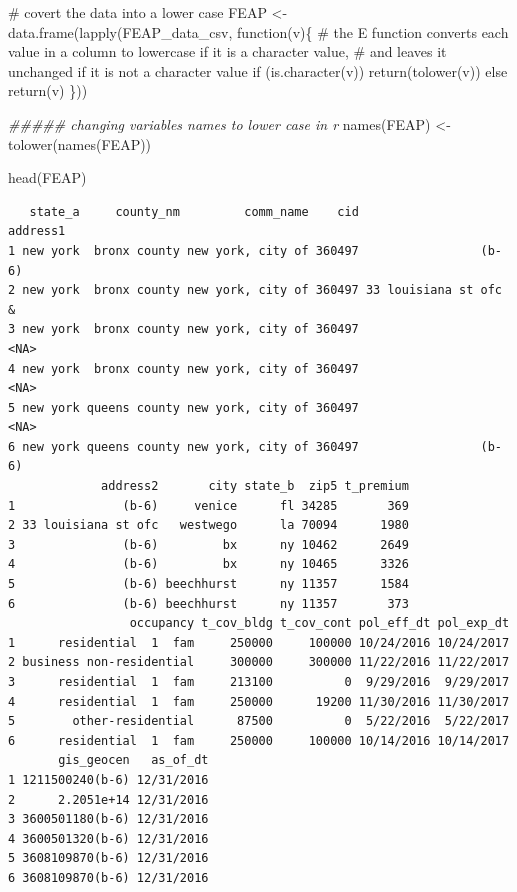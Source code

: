 \documentclass[
  letterpaper,
  DIV=11,
  numbers=noendperiod]{scrartcl}
\newenvironment{Shaded}{\begin{snugshade}}{\end{snugshade}}
\newcommand{\CommentTok}[1]{\textcolor[rgb]{0.37,0.37,0.37}{#1}}
\newcommand{\ControlFlowTok}[1]{\textcolor[rgb]{0.00,0.23,0.31}{#1}}
\newcommand{\DocumentationTok}[1]{\textcolor[rgb]{0.37,0.37,0.37}{\textit{#1}}}
\newcommand{\FunctionTok}[1]{\textcolor[rgb]{0.28,0.35,0.67}{#1}}
\newcommand{\NormalTok}[1]{\textcolor[rgb]{0.00,0.23,0.31}{#1}}
\newcommand{\OtherTok}[1]{\textcolor[rgb]{0.00,0.23,0.31}{#1}}
\begin{document}
\begin{Shaded}
\begin{Highlighting}[]
\CommentTok{\# covert the data into a lower case }
\NormalTok{FEAP }\OtherTok{\textless{}{-}} \FunctionTok{data.frame}\NormalTok{(}\FunctionTok{lapply}\NormalTok{(FEAP\_data\_csv, }\ControlFlowTok{function}\NormalTok{(v)\{}
  \CommentTok{\# the E function converts each value in a column to lowercase if it is a character value,}
  \CommentTok{\# and leaves it unchanged if it is not a character value}
  \ControlFlowTok{if}\NormalTok{ (}\FunctionTok{is.character}\NormalTok{(v)) }
    \FunctionTok{return}\NormalTok{(}\FunctionTok{tolower}\NormalTok{(v))}
  \ControlFlowTok{else} 
    \FunctionTok{return}\NormalTok{(v)}
\NormalTok{\}))}

\DocumentationTok{\#\#\#\#\# changing variables names to lower case in r}
\FunctionTok{names}\NormalTok{(FEAP) }\OtherTok{\textless{}{-}} \FunctionTok{tolower}\NormalTok{(}\FunctionTok{names}\NormalTok{(FEAP))}

\FunctionTok{head}\NormalTok{(FEAP)}
\end{Highlighting}
\end{Shaded}

\begin{verbatim}
   state_a     county_nm         comm_name    cid              address1
1 new york  bronx county new york, city of 360497                 (b-6)
2 new york  bronx county new york, city of 360497 33 louisiana st ofc &
3 new york  bronx county new york, city of 360497                  <NA>
4 new york  bronx county new york, city of 360497                  <NA>
5 new york queens county new york, city of 360497                  <NA>
6 new york queens county new york, city of 360497                 (b-6)
             address2       city state_b  zip5 t_premium
1               (b-6)     venice      fl 34285       369
2 33 louisiana st ofc   westwego      la 70094      1980
3               (b-6)         bx      ny 10462      2649
4               (b-6)         bx      ny 10465      3326
5               (b-6) beechhurst      ny 11357      1584
6               (b-6) beechhurst      ny 11357       373
                 occupancy t_cov_bldg t_cov_cont pol_eff_dt pol_exp_dt
1      residential  1  fam     250000     100000 10/24/2016 10/24/2017
2 business non-residential     300000     300000 11/22/2016 11/22/2017
3      residential  1  fam     213100          0  9/29/2016  9/29/2017
4      residential  1  fam     250000      19200 11/30/2016 11/30/2017
5        other-residential      87500          0  5/22/2016  5/22/2017
6      residential  1  fam     250000     100000 10/14/2016 10/14/2017
       gis_geocen   as_of_dt
1 1211500240(b-6) 12/31/2016
2      2.2051e+14 12/31/2016
3 3600501180(b-6) 12/31/2016
4 3600501320(b-6) 12/31/2016
5 3608109870(b-6) 12/31/2016
6 3608109870(b-6) 12/31/2016
\end{verbatim}
\end{document}
